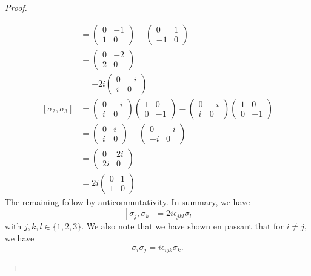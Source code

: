 \begin{proof}
\begin{parts}
\begin{align*}
					     &= \begin{pmatrix}  0 & -1 \\ 1 & 0 \end{pmatrix} - \begin{pmatrix} 0 & 1 \\ -1 & 0 \end{pmatrix}  \\
					     &= \begin{pmatrix} 0 & -2 \\ 2 & 0 \end{pmatrix}  \\
					     &= -2i \begin{pmatrix} 0 &-i \\ i & 0 \end{pmatrix}  \\
			[\sigma_2,\sigma_3] &= \begin{pmatrix}  0 & -i \\ i & 0 \end{pmatrix} \begin{pmatrix} 1 & 0 \\ 0 & -1 \end{pmatrix} - \begin{pmatrix} 0 & -i \\ i & 0 \end{pmatrix} \begin{pmatrix}  1 & 0 \\ 0 & -1 \end{pmatrix}  \\
					    &= \begin{pmatrix} 0 & i \\ i & 0 \end{pmatrix} - \begin{pmatrix}  0 & -i \\ -i & 0 \end{pmatrix}   \\
					    &= \begin{pmatrix} 0 & 2i \\ 2i & 0 \end{pmatrix}  \\
					    &= 2i \begin{pmatrix} 0 & 1 \\ 1 & 0 \end{pmatrix}  
		\end{align*}
		The remaining follow by anticommutativity. In summary, we have
		\[
			[\sigma_j,\sigma_k]=2i\epsilon_{jkl}\sigma_l
	\]
	with $j,k,l\in \{1,2,3\} $. We also note that we have shown en passant that for $i\neq j$, we have
	\[
		\sigma_i\sigma_j=i\epsilon_{ijk}\sigma_k
	.\] 


\end{parts}
\end{proof}
